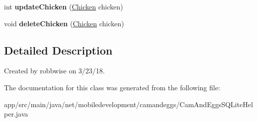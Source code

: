 \begin{DoxyCompactItemize}
\item 
\mbox{\label{classnet_1_1mobiledevelopment_1_1camandeggs_1_1_cam_and_eggs_s_q_lite_helper_a2c719648254dd1e4471545ea356d32fd}} 
int {\bfseries update\+Chicken} (\hyperlink{classnet_1_1mobiledevelopment_1_1camandeggs_1_1_chicken}{Chicken} chicken)
\item 
\mbox{\label{classnet_1_1mobiledevelopment_1_1camandeggs_1_1_cam_and_eggs_s_q_lite_helper_abfdf570911ef701c2005ca8a3a865dd3}} 
void {\bfseries delete\+Chicken} (\hyperlink{classnet_1_1mobiledevelopment_1_1camandeggs_1_1_chicken}{Chicken} chicken)
\end{DoxyCompactItemize}


\subsection{Detailed Description}
Created by robbwise on 3/23/18. 

The documentation for this class was generated from the following file\+:\begin{DoxyCompactItemize}
\item 
app/src/main/java/net/mobiledevelopment/camandeggs/Cam\+And\+Eggs\+S\+Q\+Lite\+Helper.\+java\end{DoxyCompactItemize}
